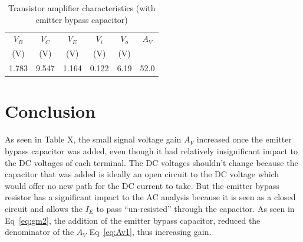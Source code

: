 \begin{table}[hbtp]
  \centering
  \begin{tabular}{ccc|cc|c}
    $V_B$    & $V_C$    & $V_E$    & $V_i$    & $V_o$    & $A_V$ \\
    (\si{V}) & (\si{V}) & (\si{V}) & (\si{V}) & (\si{V}) &       \\
    \hline
    1.783    & 9.547    & 1.164    & 0.122    & 6.19     & 52.0
  \end{tabular}
  \caption{\label{tab:amp_bypass} Transistor amplifier characteristics (with emitter bypass capacitor)}
\end{table}


\section{Conclusion}
\label{sec:conclusion}

As seen in Table X, the small signal voltage gain $A_V$ increased once the emitter bypass capacitor was added, even though it had relatively insignificant impact to the DC voltages of each terminal. The DC voltages shouldn’t change because the capacitor that was added is ideally an open circuit to the DC voltage which would offer no new path for the DC current to take. But the emitter bypass resistor has a significant impact to the AC analysis because it is seen as a closed circuit and allows the $I_E$ to pass “un-resisted” through the capacitor. As seen in Eq~\ref{eq:gm2}, the addition of the emitter bypass capacitor, reduced the denominator of the $A_V$ Eq~\ref{eq:Av1}, thus increasing gain.

